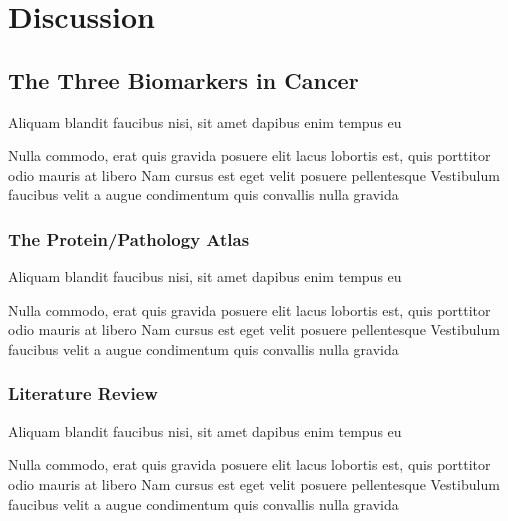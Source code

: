 \documentclass[
paper=landscape,
paper=160mm:90mm, %
fontsize=11pt, %
pagesize, %
parskip=half-, %
]{scrartcl} %
\theoremstyle{mythmstyle} %
\begin{document}



\section{Discussion}
\subsection{The Three Biomarkers in Cancer}

\begin{outline}

\1 Aliquam blandit faucibus nisi, sit amet dapibus enim tempus eu

\2 Nulla commodo, erat quis gravida posuere
\1 elit lacus lobortis est, quis porttitor odio mauris at libero
\1 Nam cursus est eget velit posuere pellentesque
\1 Vestibulum faucibus velit a augue condimentum quis convallis nulla gravida

\end{outline}


\clearpage

\subsubsection*{The Protein/Pathology Atlas} %

\begin{outline}

\1 Aliquam blandit faucibus nisi, sit amet dapibus enim tempus eu

\2 Nulla commodo, erat quis gravida posuere
\1 elit lacus lobortis est, quis porttitor odio mauris at libero
\1 Nam cursus est eget velit posuere pellentesque
\1 Vestibulum faucibus velit a augue condimentum quis convallis nulla gravida

\end{outline}


\clearpage

\subsubsection*{Literature Review} %

\begin{outline}

\1 Aliquam blandit faucibus nisi, sit amet dapibus enim tempus eu

\2 Nulla commodo, erat quis gravida posuere
\1 elit lacus lobortis est, quis porttitor odio mauris at libero
\1 Nam cursus est eget velit posuere pellentesque
\1 Vestibulum faucibus velit a augue condimentum quis convallis nulla gravida

\end{outline}
\end{document}
